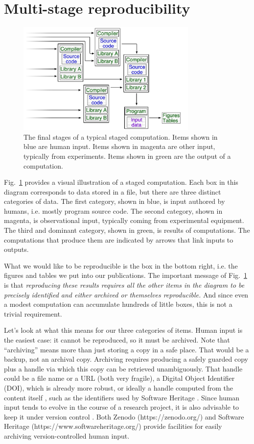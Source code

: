 \documentclass[10pt,journal,compsoc]{IEEEtran}
\begin{document}
\section{Multi-stage reproducibility}

\begin{figure}[tbh]
\centering
\includegraphics[width=3.5in]{fig-1.pdf}
\caption{The final stages of a typical staged computation. Items shown in blue are human input. Items shown in magenta are other input, typically from experiments. Items shown in green are the output of a computation.}
\label{fig:staged-computation}
\end{figure}

Fig.~\ref{fig:staged-computation} provides a visual illustration of a staged computation. Each box in this diagram corresponds to data stored in a file, but there are three distinct categories of data. The first category, shown in blue, is input authored by humans, i.e. mostly program source code. The second category, shown in magenta, is observational input, typically coming from experimental equipment. The third and dominant category, shown in green, is results of computations. The computations that produce them are indicated by arrows that link inputs to outputs.

What we would like to be reproducible is the box in the bottom right, i.e. the figures and tables we put into our publications. The important message of Fig.~\ref{fig:staged-computation} is that \textit{reproducing these results requires all the other items in the diagram to be precisely identified and either archived or themselves reproducible.} And since even a modest computation can accumulate hundreds of little boxes, this is not a trivial requirement.

Let's look at what this means for our three categories of items. Human input is the easiest case: it cannot be reproduced, so it must be archived. Note that ``archiving'' means more than just storing a copy in a safe place. That would be a backup, not an archival copy. Archiving requires producing a safely guarded copy plus a handle via which this copy can be retrieved unambiguously. That handle could be a file name or a URL (both very fragile), a Digital Object Identifier (DOI), which is already more robust, or ideally a handle computed from the content itself \cite{content-addressable}, such as the identifiers used by Software Heritage \cite{SWHid}. Since human input tends to evolve in the course of a research project, it is also advisable to keep it under version control \cite{version-control}. Both  Zenodo (https://zenodo.org/) and Software Heritage (https://www.softwareheritage.org/) provide facilities for easily archiving version-controlled human input.
\end{document}
